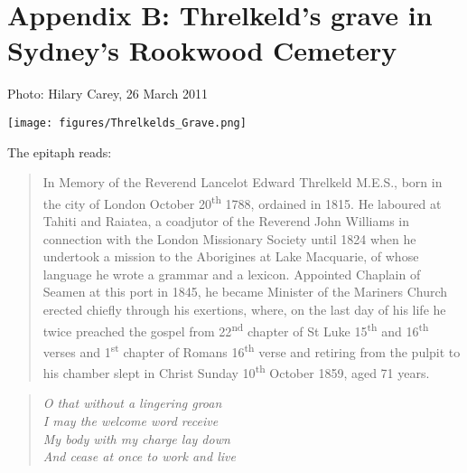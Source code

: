 \chapter*{Appendix B: Threlkeld’s grave in Sydney’s Rookwood Cemetery}
\label{Appendix_B}

Photo: Hilary Carey, 26 March 2011

\bigskip

\texttt{[image: figures/Threlkelds\_Grave.png]}

\bigskip

\enlargethispage{\baselineskip}

The epitaph reads:

\begin{quote}
    In Memory of the Reverend Lancelot Edward Threlkeld M.E.S., born in the city of London October 20\textsuperscript{th} 1788, ordained in 1815. He laboured at Tahiti and Raiatea, a coadjutor of the Reverend John Williams in connection with the London Missionary Society until 1824 when he undertook a mission to the Aborigines at Lake Macquarie, of whose language he wrote a grammar and a lexicon. Appointed Chaplain of Seamen at this port in 1845, he became Minister of the Mariners Church erected chiefly through his exertions, where, on the last day of his life he twice preached the gospel from 22\textsuperscript{nd} chapter of St Luke 15\textsuperscript{th} and 16\textsuperscript{th} verses and 1\textsuperscript{st} chapter of Romans 16\textsuperscript{th} verse and retiring from the pulpit to his chamber slept in Christ Sunday 10\textsuperscript{th} October 1859, aged 71 years.
\end{quote}

\begin{quote}
    \textit{O that without a lingering groan \\
    I may the welcome word receive \\
    My body with my charge lay down \\
    And cease at once to work and live} \\
\end{quote}

